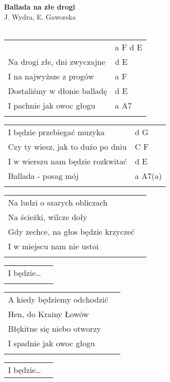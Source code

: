 \documentclass[a5paper]{article}
\begin{document}


\noindent
\fontsize{12pt}{15pt}\selectfont
\textbf{Ballada na złe drogi} \\
\fontsize{8pt}{10pt}\selectfont
J. Wydra, E. Gaworska \\ \\
\fontsize{10pt}{12pt}\selectfont
{}
\begin{tabular}{@{}p{8.5cm}p{3cm}@{}}
\noindent
& a F d E \\ 
Na drogi złe, dni zwyczajne & d E \\
I na najwyższe z progów & a F \\
Dostaliśmy w dłonie balladę & d E \\
I pachnie jak owoc głogu & a A7 \\ \\
\end{tabular}

\noindent
\begin{tabular}{@{}p{7.5cm}p{3cm}@{}} 
I będzie przebiegać muzyka & d G \\
Czy ty wiesz, jak to dużo po dniu & C F \\
I w wierszu nam będzie rozkwitać & d E \\
Ballada - posag mój & a A7(a) \\ \\
\end{tabular}

\noindent
\begin{tabular}{@{}p{8.5cm}p{3cm}@{}}
Na ludzi o szarych obliczach \\
Na ścieżki, wilcze doły \\
Gdy zechce, na głos będzie krzyczeć \\
I w miejscu nam nie ustoi \\ \\
\end{tabular}

\noindent
\begin{tabular}{@{}p{8.5cm}p{3cm}@{}}
I będzie… \\ \\
\end{tabular}

\noindent
\begin{tabular}{@{}p{8.5cm}p{3cm}@{}}
A kiedy będziemy odchodzić \\
Hen, do Krainy Łowów \\
Błękitne się niebo otworzy \\
I spadnie jak owoc głogu \\ \\
\end{tabular}

\noindent
\begin{tabular}{@{}p{8.5cm}p{3cm}@{}}
I będzie…
\end{tabular}
\end{document}
